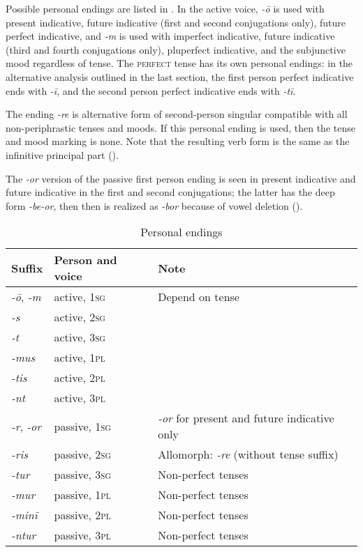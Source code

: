 \documentclass[a4paper, oneside]{report}
\newcommand{\form}[1]{\emph{#1}}
\newcommand*{\category}[1]{\textsc{#1}}
\begin{document}
Possible personal endings are listed in .
In the active voice, 
\form{-\={o}} is used with present indicative, 
future indicative (first and second conjugations only), 
future perfect indicative,
and \form{-m} is used with imperfect indicative, 
future indicative (third and fourth conjugations only),
pluperfect indicative,
and the subjunctive mood regardless of tense.
The \category{perfect} tense has its own personal endings:
in the alternative analysis outlined in the last section,
the first person perfect indicative ends with \form{-ī},
and the second person perfect indicative ends with \form{-tī}.

The ending \form{-re} is alternative form of second-person singular compatible 
with all non-periphrastic tenses and moods.
If this personal ending is used, then the tense and mood marking is none.
Note that the resulting verb form is the same as the infinitive principal part
().

The \form{-or} version of the passive first person ending 
is seen in present indicative and future indicative
in the first and second conjugations;
the latter has the deep form \form{-be-or},
then then is realized as \form{-bor} because of vowel deletion 
().

\begin{table}[H]
    \caption{Personal endings}
    \label{tbl:personal-ending}
    \centering
    \begin{tabular}{lll}
        \toprule
        Suffix & Person and voice & Note \\
        \midrule
        \form{-\={o}}, \form{-m} & active, \category{1sg} & Depend on tense \\ 
        \form{-s}                & active, \category{2sg} & \\ 
        \form{-t}                & active, \category{3sg} & \\ 
        \form{-mus}              & active, \category{1pl} & \\
        \form{-tis}              & active, \category{2pl} & \\
        \form{-nt}               & active, \category{3pl} & \\ \midrule 
        \form{-r}, \form{-or}    & passive, \category{1sg} & \form{-or} for present and future indicative only \\ 
        \form{-ris}              & passive, \category{2sg} & Allomorph: \form{-re} (without tense suffix) \\
        \form{-tur}              & passive, \category{3sg} & Non-perfect tenses \\
        \form{-mur}              & passive, \category{1pl} & Non-perfect tenses \\
        \form{-minī}             & passive, \category{2pl} & Non-perfect tenses \\
        \form{-ntur}             & passive, \category{3pl} & Non-perfect tenses \\ \bottomrule
    \end{tabular}
\end{table}
\end{document}
